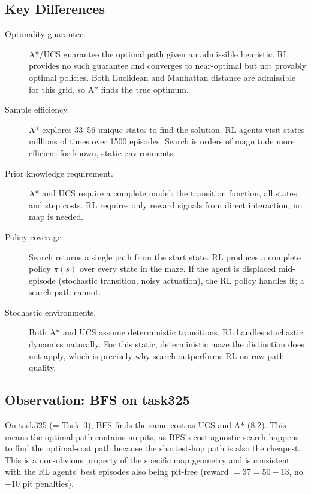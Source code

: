 \documentclass[11pt,letterpaper]{article}
\begin{document}
\subsection{Key Differences}

\begin{description}
  \item[Optimality guarantee.] A*/UCS guarantee the optimal path given an admissible
    heuristic. RL provides no such guarantee and converges to near-optimal but not
    provably optimal policies. Both Euclidean and Manhattan distance are admissible
    for this grid, so A* finds the true optimum.

  \item[Sample efficiency.] A* explores 33--56 unique states to find the solution.
    RL agents visit states millions of times over 1500 episodes. Search is orders of
    magnitude more efficient for known, static environments.

  \item[Prior knowledge requirement.] A* and UCS require a complete model: the
    transition function, all states, and step costs. RL requires only reward signals
    from direct interaction, no map is needed.

  \item[Policy coverage.] Search returns a single path from the start state. RL
    produces a complete policy $\pi(s)$ over every state in the maze. If the agent is
    displaced mid-episode (stochastic transition, noisy actuation), the RL policy
    handles it; a search path cannot.

  \item[Stochastic environments.] Both A* and UCS assume deterministic transitions.
    RL handles stochastic dynamics naturally. For this static, deterministic maze the
    distinction does not apply, which is precisely why search outperforms RL on
    raw path quality.
\end{description}

\subsection{Observation: BFS on task325}

On task325 (= Task~3), BFS finds the same cost as UCS and A* (8.2). This means the
optimal path contains no pits, as BFS's cost-agnostic search happens to find the
optimal-cost path because the shortest-hop path is also the cheapest. This is a
non-obvious property of the specific map geometry and is consistent with the RL
agents' best episodes also being pit-free (reward $= 37 = 50 - 13$, no $-10$
pit penalties).
\end{document}
